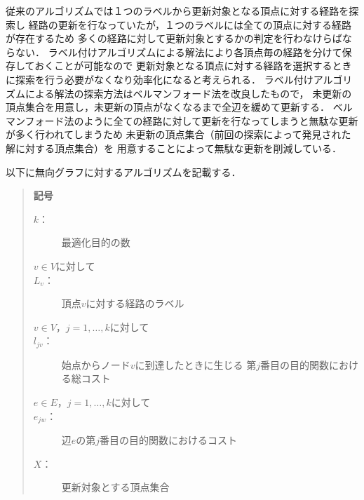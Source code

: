 \documentclass[12pt]{optlab-bachelor}
\begin{document}
従来のアルゴリズムでは１つのラベルから更新対象となる頂点に対する経路を探索し
経路の更新を行なっていたが，１つのラベルには全ての頂点に対する経路が存在するため
多くの経路に対して更新対象とするかの判定を行わなけらばならない．
ラベル付けアルゴリズムによる解法により各頂点毎の経路を分けて保存しておくことが可能なので
更新対象となる頂点に対する経路を選択するときに探索を行う必要がなくなり効率化になると考えられる．
ラベル付けアルゴリズムによる解法の探索方法はベルマンフォード法を改良したもので，
未更新の頂点集合を用意し，未更新の頂点がなくなるまで全辺を緩めて更新する．
ベルマンフォード法のように全ての経路に対して更新を行なってしまうと無駄な更新が多く行われてしまうため
未更新の頂点集合（前回の探索によって発見された解に対する頂点集合）を
用意することによって無駄な更新を削減している．


以下に無向グラフに対するアルゴリズムを記載する．

\begin{quote}
  \textbf{記号}
  \begin{description}
    \item[$k$：] 最適化目的の数
    \item[$v \in V$に対して]
    \item[$L_v$：] 頂点$v$に対する経路のラベル
    \item[$v \in V$，$j = 1 , \ldots , k$に対して]
    \item[$l_{jv}$：] 始点からノード$v$に到達したときに生じる
    第$j$番目の目的関数における総コスト
    \item[$e \in E$，$j = 1 , \ldots , k$に対して]
    \item[$e_{jw}$：] 辺$e$の第$j$番目の目的関数におけるコスト
    \item[$X$：] 更新対象とする頂点集合
  \end{description}
\end{quote}
\end{document}
